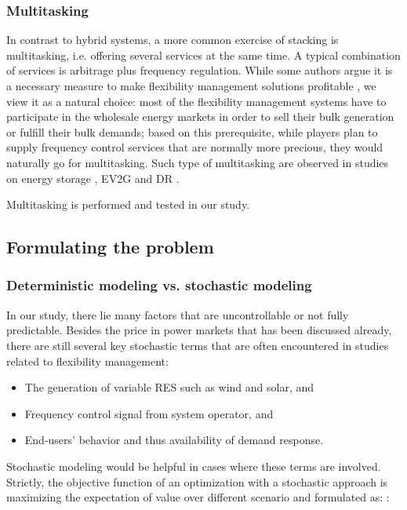 \subsubsection{Multitasking}
In contrast to hybrid systems, a more common exercise of stacking is multitasking, i.e. offering several services at the same time. A typical combination of services is arbitrage plus frequency regulation. While some authors argue it is a necessary measure to make flexibility management solutions profitable \cite{Zucker2013,Megel2017}, we view it as a natural choice: most of the flexibility management systems have to participate in the wholesale energy markets in order to sell their bulk generation or fulfill their bulk demands; based on this prerequisite, while players plan to supply frequency control services that are normally more precious, they would naturally go for multitasking. Such type of multitasking are observed in studies on energy storage \cite{Byrne2012, Berrada2016,Megel2017}, EV2G \cite{Sortomme2012,Cho2015,Alipour2017,Peng2017} and DR \cite{Roos2014}.

Multitasking is performed and tested in our study.

\subsection{Formulating the problem}
\label{sec:formulating-solving}

\subsubsection{Deterministic modeling vs. stochastic modeling}
In our study, there lie many factors that are uncontrollable or not fully predictable. Besides the price in power markets that has been discussed already, there are still several key stochastic terms that are often encountered in studies related to flexibility management: 

\begin{itemize}
	\item The generation of variable RES such as wind and solar, and
	\item Frequency control signal from system operator, and
	\item End-users' behavior and thus availability of demand response.
\end{itemize}

Stochastic modeling would be helpful in cases where these terms are involved. Strictly, the objective function of an optimization with a stochastic approach is maximizing the expectation of value over different scenario and formulated as:  \cite{Zucker2013}:

